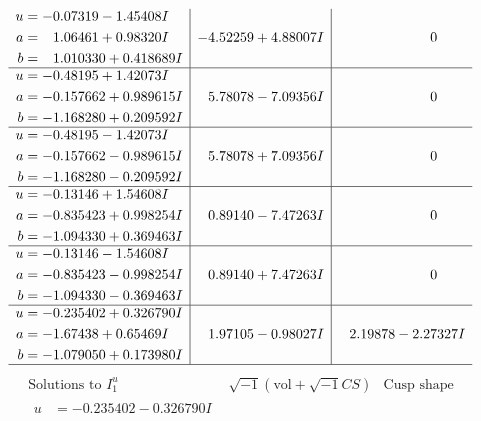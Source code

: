 \documentclass[1p]{elsarticle_modified}
\theoremstyle{definition}
\newcommand{\I}{\sqrt{-1}}
\begin{document}
$$\begin{array}{c|c|c}
\begin{aligned}
u &= -0.07319 - 1.45408 I \\
a &= \phantom{-}1.06461 + 0.98320 I \\
b &= \phantom{-}1.010330 + 0.418689 I\end{aligned}
 & -4.52259 + 4.88007 I & \phantom{-0.000000 } 0 \\ \hline\begin{aligned}
u &= -0.48195 + 1.42073 I \\
a &= -0.157662 + 0.989615 I \\
b &= -1.168280 + 0.209592 I\end{aligned}
 & \phantom{-}5.78078 - 7.09356 I & \phantom{-0.000000 } 0 \\ \hline\begin{aligned}
u &= -0.48195 - 1.42073 I \\
a &= -0.157662 - 0.989615 I \\
b &= -1.168280 - 0.209592 I\end{aligned}
 & \phantom{-}5.78078 + 7.09356 I & \phantom{-0.000000 } 0 \\ \hline\begin{aligned}
u &= -0.13146 + 1.54608 I \\
a &= -0.835423 + 0.998254 I \\
b &= -1.094330 + 0.369463 I\end{aligned}
 & \phantom{-}0.89140 - 7.47263 I & \phantom{-0.000000 } 0 \\ \hline\begin{aligned}
u &= -0.13146 - 1.54608 I \\
a &= -0.835423 - 0.998254 I \\
b &= -1.094330 - 0.369463 I\end{aligned}
 & \phantom{-}0.89140 + 7.47263 I & \phantom{-0.000000 } 0 \\ \hline\begin{aligned}
u &= -0.235402 + 0.326790 I \\
a &= -1.67438 + 0.65469 I \\
b &= -1.079050 + 0.173980 I\end{aligned}
 & \phantom{-}1.97105 - 0.98027 I & \phantom{-}2.19878 - 2.27327 I\\
 \hline 
 \end{array}$$\newpage$$\begin{array}{c|c|c}  
\text{Solutions to }I^u_{1}& \I (\text{vol} + \sqrt{-1}CS) & \text{Cusp shape}\\
 \hline 
\begin{aligned}
u &= -0.235402 - 0.326790 I \\

\end{aligned}
\end{array}$$
\end{document}

